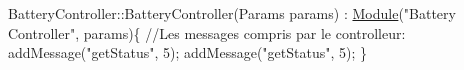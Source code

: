\begin{DoxyCode}
BatteryController::BatteryController(Params params) : \hyperlink{classModule}{Module}(\textcolor{stringliteral}{"Battery
       Controller"}, params)\{
    \textcolor{comment}{//Les messages compris par le controlleur:}
    addMessage(\textcolor{stringliteral}{"getStatus"}, 5);
    addMessage(\textcolor{stringliteral}{"getStatus"}, 5);
\}
\end{DoxyCode}
 